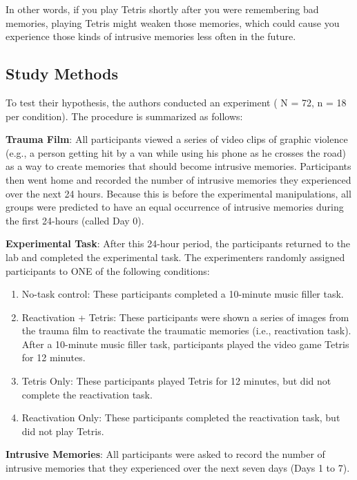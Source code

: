 \documentclass[]{book}
\providecommand{\tightlist}{%
  \setlength{\itemsep}{0pt}\setlength{\parskip}{0pt}}
\theoremstyle{definition}
\theoremstyle{definition}
\theoremstyle{definition}
\theoremstyle{remark}
\begin{document}
In other words, if you play Tetris shortly after you were remembering
bad memories, playing Tetris might weaken those memories, which could
cause you experience those kinds of intrusive memories less often in the
future.

\subsection{Study Methods}\label{study-methods}

To test their hypothesis, the authors conducted an experiment ( N = 72,
n = 18 per condition). The procedure is summarized as follows:

\textbf{Trauma Film}: All participants viewed a series of video clips of
graphic violence (e.g., a person getting hit by a van while using his
phone as he crosses the road) as a way to create memories that should
become intrusive memories. Participants then went home and recorded the
number of intrusive memories they experienced over the next 24 hours.
Because this is before the experimental manipulations, all groups were
predicted to have an equal occurrence of intrusive memories during the
first 24-hours (called Day 0).

\textbf{Experimental Task}: After this 24-hour period, the participants
returned to the lab and completed the experimental task. The
experimenters randomly assigned participants to ONE of the following
conditions:

\begin{enumerate}
\def\labelenumi{\arabic{enumi}.}
\tightlist
\item
  No-task control: These participants completed a 10-minute music filler
  task.
\item
  Reactivation + Tetris: These participants were shown a series of
  images from the trauma film to reactivate the traumatic memories
  (i.e., reactivation task). After a 10-minute music filler task,
  participants played the video game Tetris for 12 minutes.
\item
  Tetris Only: These participants played Tetris for 12 minutes, but did
  not complete the reactivation task.
\item
  Reactivation Only: These participants completed the reactivation task,
  but did not play Tetris.
\end{enumerate}

\textbf{Intrusive Memories}: All participants were asked to record the
number of intrusive memories that they experienced over the next seven
days (Days 1 to 7).
\end{document}
